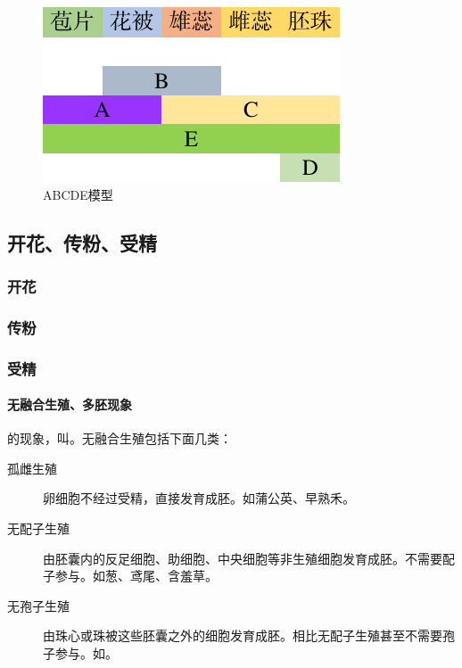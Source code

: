 \begin{figure}[h]
\centering
\includegraphics{Pics/ABCDE模型.pdf}
\caption[ABCDE模型]{ABCDE模型}
\label{fig:abcde}
\end{figure}


\subsection{开花、传粉、受精}

\subsubsection{开花}

\subsubsection{传粉}

\subsubsection{受精}

\paragraph{无融合生殖、多胚现象}

的现象，叫。无融合生殖包括下面几类：

\begin{description}
	\item[孤雌生殖] 卵细胞不经过受精，直接发育成胚。如蒲公英、早熟禾。
	\item[无配子生殖] 由胚囊内的反足细胞、助细胞、中央细胞等非生殖细胞发育成胚。不需要配子参与。如葱、鸢尾、含羞草。
	\item[无孢子生殖] 由珠心或珠被这些胚囊之外的细胞发育成胚。相比无配子生殖甚至不需要孢子参与。如。
\end{description}


